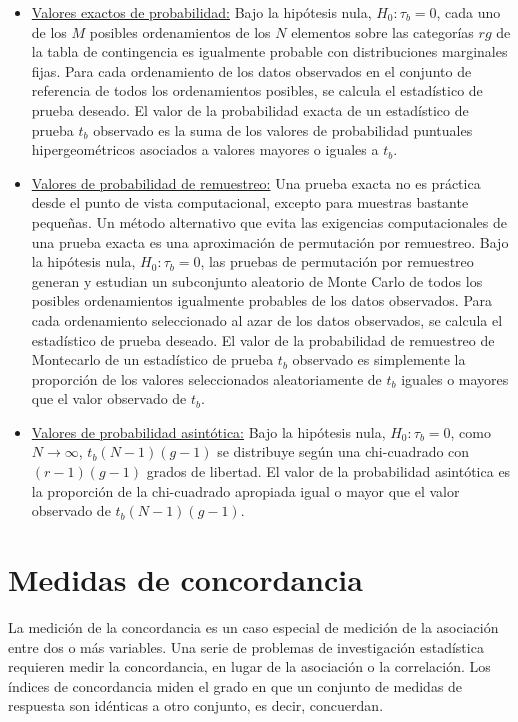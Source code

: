 \documentclass[12pt,a4paper,]{book}
\numberwithin{dummy}{section}
\theoremstyle{ocrenumbox}
\theoremstyle{blacknumex}
\theoremstyle{blacknumbox}
\theoremstyle{ocrenum}
\theoremstyle{ocrenum}
\begin{document}
\begin{itemize}
\item
  \underline{Valores exactos de probabilidad:} Bajo la hipótesis nula,
  \(H_0: \tau_b = 0\), cada uno de los \(M\) posibles ordenamientos de
  los \(N\) elementos sobre las categorías \(rg\) de la tabla de
  contingencia es igualmente probable con distribuciones marginales
  fijas. Para cada ordenamiento de los datos observados en el conjunto
  de referencia de todos los ordenamientos posibles, se calcula el
  estadístico de prueba deseado. El valor de la probabilidad exacta de
  un estadístico de prueba \(t_b\) observado es la suma de los valores
  de probabilidad puntuales hipergeométricos asociados a valores mayores
  o iguales a \(t_b\).
\item
  \underline{Valores de probabilidad de remuestreo:} Una prueba exacta
  no es práctica desde el punto de vista computacional, excepto para
  muestras bastante pequeñas. Un método alternativo que evita las
  exigencias computacionales de una prueba exacta es una aproximación de
  permutación por remuestreo. Bajo la hipótesis nula,
  \(H_0: \tau_b = 0\), las pruebas de permutación por remuestreo generan
  y estudian un subconjunto aleatorio de Monte Carlo de todos los
  posibles ordenamientos igualmente probables de los datos observados.
  Para cada ordenamiento seleccionado al azar de los datos observados,
  se calcula el estadístico de prueba deseado. El valor de la
  probabilidad de remuestreo de Montecarlo de un estadístico de prueba
  \(t_b\) observado es simplemente la proporción de los valores
  seleccionados aleatoriamente de \(t_b\) iguales o mayores que el valor
  observado de \(t_b\).
\item
  \underline{Valores de probabilidad asintótica:} Bajo la hipótesis
  nula, \(H_0: \tau_b = 0\), como \(N \rightarrow \infty\),
  \(t_b(N-1)(g-1)\) se distribuye según una chi-cuadrado con
  \((r-1)(g-1)\) grados de libertad. El valor de la probabilidad
  asintótica es la proporción de la chi-cuadrado apropiada igual o mayor
  que el valor observado de \(t_b(N -1)(g-1)\).
\end{itemize}

\hypertarget{medidas-de-concordancia}{%
\section{Medidas de concordancia}\label{medidas-de-concordancia}}

La medición de la concordancia es un caso especial de medición de la
asociación entre dos o más variables. Una serie de problemas de
investigación estadística requieren medir la concordancia, en lugar de
la asociación o la correlación. Los índices de concordancia miden el
grado en que un conjunto de medidas de respuesta son idénticas a otro
conjunto, es decir, concuerdan.
\end{document}
